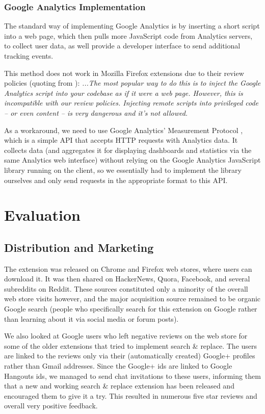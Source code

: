 \documentclass[bsc,frontabs,twoside,singlespacing,parskip,deptreport]{infthesis}
\begin{document}
\subsection{Google Analytics Implementation}
The standard way of implementing Google Analytics is by inserting a short script into a web page, which then pulls more JavaScript code from Analytics servers, to collect user data, as well provide a developer interface to send additional tracking events.

This method does not work in Mozilla Firefox extensions due to their review policies (quoting from \cite{A20}): \textit{...The most popular way to do this is to inject the Google Analytics script into your codebase as if it were a web page. However, this is incompatible with our review policies. Injecting remote scripts into privileged code – or even content – is very dangerous and it’s not allowed.}

As a workaround, we need to use Google Analytics' Measurement Protocol \cite{A21}, which is a simple API that accepts HTTP requests with Analytics data. It collects data (and aggregates it for displaying dashboards and statistics via the same Analytics web interface) without relying on the Google Analytics JavaScript library running on the client, so we essentially had to implement the library ourselves and only send requests in the appropriate format to this API.

\chapter{Evaluation}
\section{Distribution and Marketing}
The extension was released on Chrome and Firefox web stores, where users can download it. It was then shared on HackerNews, Quora, Facebook, and several subreddits on Reddit. These sources constituted only a minority of the overall web store visits however, and the major acquisition source remained to be organic Google search (people who specifically search for this extension on Google rather than learning about it via social media or forum posts).

We also looked at Google users who left negative reviews on the web store for some of the older extensions that tried to implement search \& replace. The users are linked to the reviews only via their (automatically created) Google+ profiles rather than Gmail addresses. Since the Google+ ids are linked to Google Hangouts ids, we managed to send chat invitations to these users, informing them that a new and working search \& replace extension has been released and encouraged them to give it a try. This resulted in numerous five star reviews and overall very positive feedback.
\end{document}
